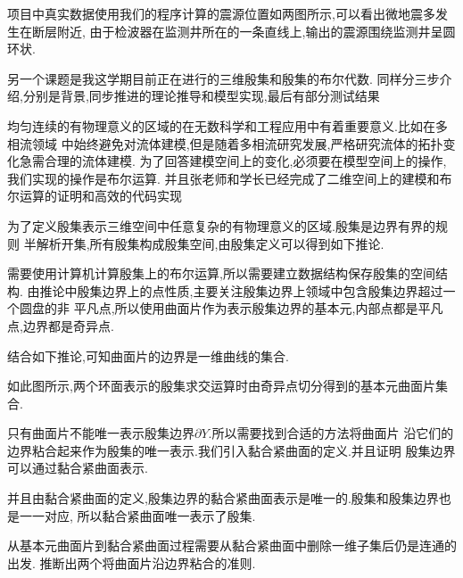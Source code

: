 \documentclass[UTF8]{ctexbeamer}	%
\theoremstyle{plain}
\theoremstyle{definition}
\theoremstyle{remark}
\numberwithin{equation}{section}
\begin{document}
\begin{frame}
    项目中真实数据使用我们的程序计算的震源位置如两图所示,可以看出微地震多发生在断层附近,
    由于检波器在监测井所在的一条直线上,输出的震源围绕监测井呈圆环状.
\end{frame}

\begin{frame}
    另一个课题是我这学期目前正在进行的三维殷集和殷集的布尔代数.
    同样分三步介绍,分别是背景,同步推进的理论推导和模型实现,最后有部分测试结果
\end{frame}

\begin{frame}
    均匀连续的有物理意义的区域的在无数科学和工程应用中有着重要意义.比如在多相流领域
    中始终避免对流体建模,但是随着多相流研究发展,严格研究流体的拓扑变化急需合理的流体建模.
    为了回答建模空间上的变化,必须要在模型空间上的操作,我们实现的操作是布尔运算.
    并且张老师和学长已经完成了二维空间上的建模和布尔运算的证明和高效的代码实现
\end{frame}

\begin{frame}
    为了定义殷集表示三维空间中任意复杂的有物理意义的区域.殷集是边界有界的规则
    半解析开集,所有殷集构成殷集空间,由殷集定义可以得到如下推论.
\end{frame}

\begin{frame}
    需要使用计算机计算殷集上的布尔运算,所以需要建立数据结构保存殷集的空间结构.
    由推论中殷集边界上的点性质,主要关注殷集边界上领域中包含殷集边界超过一个圆盘的非
    平凡点,所以使用曲面片作为表示殷集边界的基本元,内部点都是平凡点,边界都是奇异点.

    结合如下推论,可知曲面片的边界是一维曲线的集合.

\end{frame}

\begin{frame}
    如此图所示,两个环面表示的殷集求交运算时由奇异点切分得到的基本元曲面片集合.
\end{frame}

\begin{frame}
    只有曲面片不能唯一表示殷集边界$\partial Y$.所以需要找到合适的方法将曲面片
    沿它们的边界粘合起来作为殷集的唯一表示.我们引入黏合紧曲面的定义.并且证明
    殷集边界可以通过黏合紧曲面表示.
\end{frame}

\begin{frame}
    并且由黏合紧曲面的定义,殷集边界的黏合紧曲面表示是唯一的.殷集和殷集边界也是一一对应,
    所以黏合紧曲面唯一表示了殷集.

    从基本元曲面片到黏合紧曲面过程需要从黏合紧曲面中删除一维子集后仍是连通的出发.
    推断出两个将曲面片沿边界粘合的准则.
\end{frame}
\end{document}
